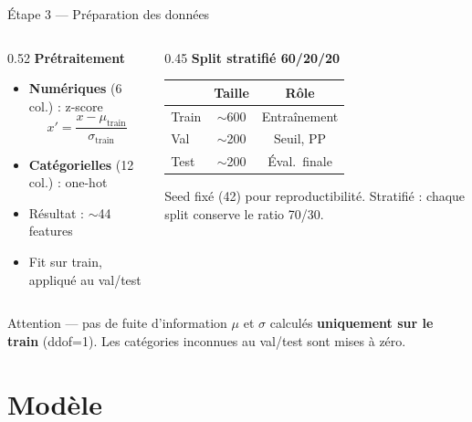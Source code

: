 \documentclass[aspectratio=169, 11pt]{beamer}
\begin{document}
\begin{frame}{\'Etape 3 --- Pr\'eparation des donn\'ees}
\begin{columns}[T]
\begin{column}{0.52\textwidth}
\textbf{Pr\'etraitement}
\begin{itemize}
    \item \textbf{Num\'eriques} (6 col.) : z-score
    $$x' = \frac{x - \mu_{\text{train}}}{\sigma_{\text{train}}}$$
    \item \textbf{Cat\'egorielles} (12 col.) : one-hot
    \item R\'esultat : $\sim$44 features
    \item Fit sur train, appliqu\'e au val/test
\end{itemize}
\end{column}
\begin{column}{0.45\textwidth}
\textbf{Split stratifi\'e 60/20/20}

\vspace{0.3em}
\small
\begin{tabular}{lcc}
\toprule
& \textbf{Taille} & \textbf{R\^ole} \\
\midrule
Train & $\sim$600 & Entra\^inement \\
Val & $\sim$200 & Seuil, PP \\
Test & $\sim$200 & \'Eval.\ finale \\
\bottomrule
\end{tabular}

\vspace{0.5em}
\scriptsize Seed fix\'e (42) pour reproductibilit\'e.
Stratifi\'e : chaque split conserve le ratio 70/30.
\end{column}
\end{columns}

\vspace{0.5em}
\begin{alertblock}{Attention --- pas de fuite d'information}
$\mu$ et $\sigma$ calcul\'es \textbf{uniquement sur le train} (ddof=1).
Les cat\'egories inconnues au val/test sont mises \`a z\'ero.
\end{alertblock}
\end{frame}

\section{Mod\`ele}
\end{document}
